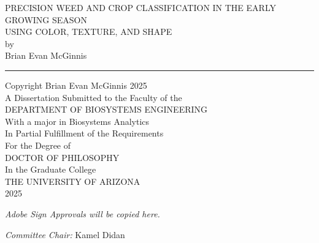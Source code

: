\documentclass[letterpaper, notitlepage]{report}
\begin{document}

\begin{titlepage}
\begin{center}
\huge
PRECISION WEED AND CROP CLASSIFICATION IN THE EARLY GROWING SEASON \\
USING COLOR, TEXTURE, AND SHAPE \\

\large
{} 
\vspace{3cm}
by\\
Brian Evan McGinnis \\
\vspace{1cm}
\hrule
\vspace{1cm}
Copyright \textcopyright  Brian Evan McGinnis 2025 \\
A Dissertation Submitted to the Faculty of the \\
DEPARTMENT OF BIOSYSTEMS ENGINEERING \\
With a major in Biosystems Analytics \\
In Partial Fulfillment of the Requirements \\
For the Degree of \\
DOCTOR OF PHILOSOPHY \\
In the Graduate College \\
THE UNIVERSITY OF ARIZONA \\
2025 \\
\end{center}
\end{titlepage}
\date{}
\newpage
{}
\setcounter{page}{2}
%
\begin{center}
\huge
\textit{Adobe Sign Approvals will be copied here.}
\end{center}
\textit{Committee Chair:} Kamel Didan
\newpage

%
%

\end{document}
